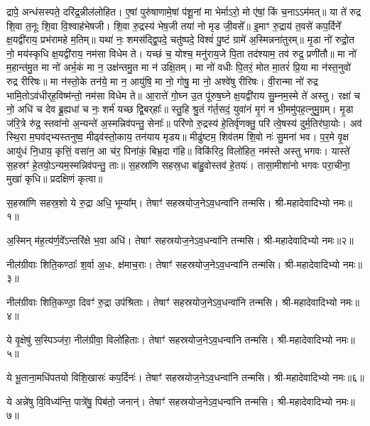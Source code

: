 द्रापे॒ अन्ध॑सस्पते॒ दरि॑द्र॒न्नील॑लोहित। ए॒षां पुरु॑षाणामे॒षां प॑शू॒नां मा भेर्माऽरो॒ मो ए॑षां॒ किं च॒नाऽऽम॑मत्॥ या ते॑ रुद्र शि॒वा त॒नूः शि॒वा वि॒श्वाह॑भेषजी। शि॒वा रु॒द्रस्य॑ भेष॒जी तया॑ नो मृड जी॒वसे᳚॥ इ॒माꣳ रु॒द्राय॑ त॒वसे॑ कप॒र्दिने᳚ क्ष॒यद्वी॑राय॒ प्रभ॑रामहे म॒तिम्॥ यथा॑ नः॒ शमस॑द्द्वि॒पदे॒ चतु॑ष्पदे॒ विश्वं॑ पु॒ष्टं ग्रामे॑ अ॒स्मिन्नना॑तुरम्॥ मृ॒डा नो॑ रुद्रो॒त नो॒ मय॑स्कृधि क्ष॒यद्वी॑राय॒ नम॑सा विधेम ते। यच्छं च॒ योश्च॒ मनु॑राय॒जे पि॒ता तद॑श्याम॒ तव॑ रुद्र॒ प्रणी॑तौ॥ मा नो॑ म॒हान्त॑मु॒त मा नो॑ अर्भ॒कं मा न॒ उक्ष॑न्तमु॒त मा न॑ उक्षि॒तम्। मा नो॑ वधीः पि॒तरं॒ मोत मा॒तरं॑ प्रि॒या मा न॑स्त॒नुवो॑ रुद्र रीरिषः॥ मा न॑स्तो॒के तन॑ये॒ मा न॒ आयु॑षि॒ मा नो॒ गोषु॒ मा नो॒ अश्वे॑षु रीरिषः। वी॒रान्मा नो॑ रुद्र भामि॒तोऽव॑धीर्‌ह॒विष्म॑न्तो॒ नम॑सा विधेम ते॥ आ॒रात्ते॑ गो॒घ्न उ॒त पू॑रुष॒घ्ने क्ष॒यद्वी॑राय सु॒म्नम॒स्मे ते॑ अस्तु। रक्षा॑ च नो॒ अधि॑ च देव ब्रू॒ह्यधा॑ च नः॒ शर्म॑ यच्छ द्वि॒बर्‌हाः᳚॥ स्तु॒हि श्रु॒तं ग॑र्त॒सदं॒ युवा॑नं मृ॒गं न भी॒ममु॑पह॒त्नुमु॒ग्रम्। मृ॒डा ज॑रि॒त्रे रु॑द्र॒ स्तवा॑नो अ॒न्यन्ते॑ अ॒स्मन्निव॑पन्तु॒ सेनाः᳚॥ परि॑णो रु॒द्रस्य॑ हे॒तिर्वृ॑णक्तु॒ परि॑ त्वे॒षस्य॑ दुर्म॒तिर॑घा॒योः। अव॑ स्थि॒रा म॒घव॑द्भ्यस्तनुष्व॒ मीढ्व॑स्तो॒काय॒ तन॑याय मृडय॥ मीढु॑ष्टम॒ शिव॑तम शि॒वो नः॑ सु॒मना॑ भव। प॒र॒मे वृ॒क्ष आयु॑धं नि॒धाय॒ कृत्तिं॒ वसा॑न॒ आ च॑र॒ पिना॑कं॒ बिभ्र॒दा ग॑हि॥ विकि॑रिद॒ विलो॑हित॒ नम॑स्ते अस्तु भगवः। यास्ते॑ स॒हस्रꣳ॑ हे॒तयो॒ऽन्यम॒स्मन्निव॑पन्तु॒ ताः॥ स॒हस्रा॑णि सहस्र॒धा बा॑हु॒वोस्तव॑ हे॒तयः॑। तासा॒मीशा॑नो भगवः परा॒चीना॒ मुखा॑ कृधि॥
प्रदक्षिणं कृत्वा॥

{\small\closesection}


स॒हस्रा॑णि सहस्र॒शो ये रु॒द्रा अधि॒ भूम्या᳚म्। तेषाꣳ॑ सहस्रयोज॒ने\-ऽव॒धन्वा॑नि तन्मसि। श्री-महादेवादिभ्यो नमः॥१॥

अ॒स्मिन् म॑ह॒त्य॑र्ण॒वे᳚ऽन्तरि॑क्षे भ॒वा अधि॑। तेषाꣳ॑ सहस्रयोज॒ने\-ऽव॒धन्वा॑नि तन्मसि। श्री-महादेवादिभ्यो नमः॥२॥

नील॑ग्रीवाः शिति॒कण्ठाः᳚ श॒र्वा अ॒धः, क्ष॑माच॒राः। तेषाꣳ॑ सहस्रयोज॒ने\-ऽव॒धन्वा॑नि तन्मसि। श्री-महादेवादिभ्यो नमः॥३॥

नील॑ग्रीवाः शिति॒कण्ठा॒ दिवꣳ॑ रु॒द्रा उप॑श्रिताः। तेषाꣳ॑ सहस्रयोज॒ने\-ऽव॒धन्वा॑नि तन्मसि। श्री-महादेवादिभ्यो नमः॥४॥

ये वृ॒क्षेषु॑ स॒स्पिञ्ज॑रा॒ नील॑ग्रीवा॒ विलो॑हिताः। तेषाꣳ॑ सहस्रयोज॒ने\-ऽव॒धन्वा॑नि तन्मसि। श्री-महादेवादिभ्यो नमः॥५॥

ये भू॒ताना॒मधि॑पतयो विशि॒खासः॑ कप॒र्दिनः॑। तेषाꣳ॑ सहस्रयोज॒ने\-ऽव॒धन्वा॑नि तन्मसि। श्री-महादेवादिभ्यो नमः॥६॥

ये अन्ने॑षु वि॒विध्य॑न्ति॒ पात्रे॑षु॒ पिब॑तो॒ जनान्॑। तेषाꣳ॑ सहस्रयोज॒ने\-ऽव॒धन्वा॑नि तन्मसि। श्री-महादेवादिभ्यो नमः॥७॥


